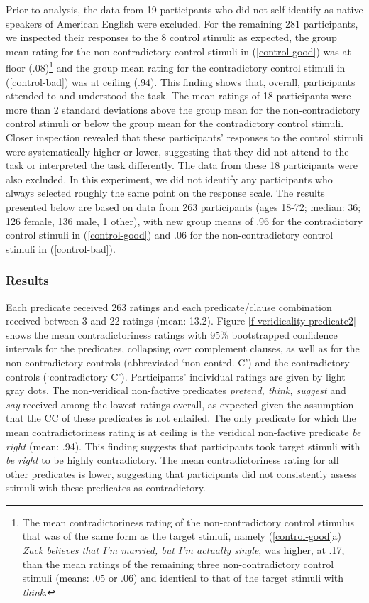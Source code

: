 \documentclass[11pt,fleqn]{article}
\newcommand{\6}{\mbox{$[\hspace*{-.6mm}[$}}
\newcommand{\9}{\mbox{$]\hspace*{-.6mm}]$}}
\begin{document}
{Prior to analysis, the data from 19 participants who did not self-identify as native speakers of American English were excluded. For the remaining 281 participants, we inspected their responses to the 8 control stimuli: as expected, the group mean rating for the non-contradictory control stimuli in (\ref{control-good}) was at floor (.08)\footnote{The mean contradictoriness rating of the non-contradictory control stimulus that was of the same form as the target stimuli, namely (\ref{control-good}a) {\em Zack believes that I'm married, but I'm actually single}, was higher, at .17, than the mean ratings of the remaining three non-contradictory control stimuli (means: .05 or .06) and identical to that of the target stimuli with {\em think}.}  and the group mean rating for the contradictory control stimuli in (\ref{control-bad}) was at ceiling (.94). This finding shows that, overall, participants attended to and understood the task. The mean ratings of 18 participants were more than 2 standard deviations above the group mean for the non-contradictory control stimuli or below the group mean for the contradictory control stimuli. Closer inspection revealed that these participants' responses to the control stimuli were systematically higher or lower, suggesting that they did not attend to the task or interpreted the task differently. The data from these 18 participants were also excluded. In this experiment, we did not identify any participants who always selected roughly the same point on the response scale. The results presented below are based on data from 263 participants (ages 18-72; median: 36; 126 female, 136 male, 1 other), with new group means of .96 for the contradictory control stimuli in (\ref{control-good}) and .06 for the non-contradictory control stimuli in (\ref{control-bad}).

\subsubsection{Results}

Each predicate received 263 ratings and each predicate/clause combination received between 3 and 22 ratings (mean: 13.2). Figure \ref{f-veridicality-predicate2} shows the mean contradictoriness ratings with 95\% bootstrapped confidence intervals for the predicates, collapsing over complement clauses, as well as for the non-contradictory controls (abbreviated `non-contrd. C')  and  the contradictory controls (`contradictory C'). Participants' individual ratings are given by light gray dots. The non-veridical non-factive predicates {\em pretend, think, suggest} and {\em say} received among the lowest ratings overall, as expected given the assumption that the CC of these predicates is not entailed. The only predicate for which the mean contradictoriness rating is at ceiling is the veridical non-factive predicate {\em be right} (mean: .94). This finding suggests that participants took target stimuli with {\em be right} to be highly contradictory. The mean contradictoriness rating for all other predicates is lower, suggesting that participants did not consistently assess stimuli with these predicates as contradictory. 

}
\end{document}
